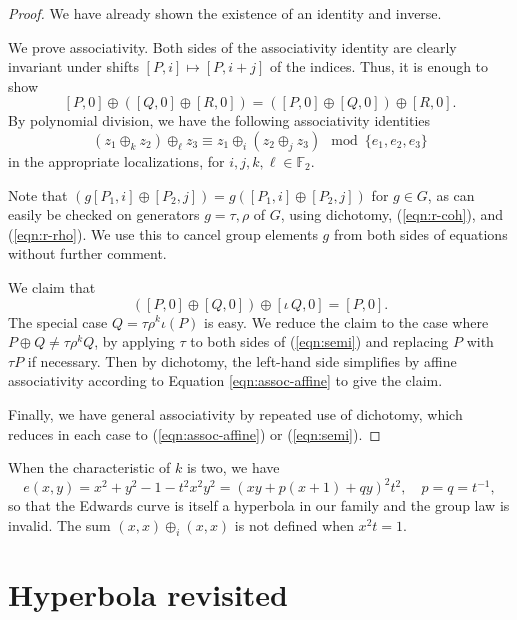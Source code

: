 \documentclass[12pt]{article}
\newcommand{\ring}[1]{\mathbb{#1}}
\begin{document}
\begin{proof} We have already shown the existence of an identity
and inverse.  

We prove associativity.  Both sides of the associativity identity are
clearly invariant under shifts $[P,i]\mapsto [P,i+j]$ of the indices.
Thus, it is enough to show
\[
[P,0] \oplus ([Q,0]\oplus [R,0]) = ([P,0]\oplus [Q,0])\oplus [R,0].
\]
By polynomial division, we have the following associativity
identities
\begin{equation}\label{eqn:assoc-affine}
 (z_1\oplus_k z_2)\oplus_\ell z_3 \equiv z_1 \oplus_i (z_2\oplus_j z_3) \mod \{e_1,e_2,e_3\}
\end{equation}
 in the appropriate localizations, for $i,j,k,\ell\in \ring{F}_2$.

Note that $(g [P_1,i]\oplus [P_2,j]) = g([P_1,i]\oplus [P_2,j])$ for $g\in G$, as can
easily be checked on generators $g=\tau,\rho$ of $G$, using dichotomy,
(\ref{eqn:r-coh}), and (\ref{eqn:r-rho}).  We use this to cancel group elements $g$ from
both sides of equations without further comment.

We claim that
\begin{equation}\label{eqn:semi}
([P,0]\oplus [Q,0])\oplus [\iota\,Q,0] = [P,0].
\end{equation}
The special case $Q= \tau\rho^k \iota(P)$ is easy. We reduce the claim to the case where 
$P\oplus Q\ne \tau\rho^k Q$,
by applying $\tau$ to both sides of (\ref{eqn:semi}) and replacing $P$ with $\tau P$ if
necessary.
Then by dichotomy, the left-hand side simplifies by affine associativity 
according to Equation \ref{eqn:assoc-affine}
to give the claim.

Finally, we have general associativity by repeated use of dichotomy,
which reduces in each case to (\ref{eqn:assoc-affine}) or (\ref{eqn:semi}).
\end{proof}

When the characteristic of $k$ is two, 
we have
\[
e(x,y)= x^2 + y^2 - 1 - t^2 x^2 y^2 = ( x y + p(x + 1) + q y)^2 t^2,\quad p=q=t^{-1},
\]
so that the Edwards curve is itself a hyperbola in our family and the group law is
invalid.  The sum
$(x,x)\oplus_i (x,x)$ is not defined when $x^2 t=1$.

\section{Hyperbola revisited}
\end{document}
